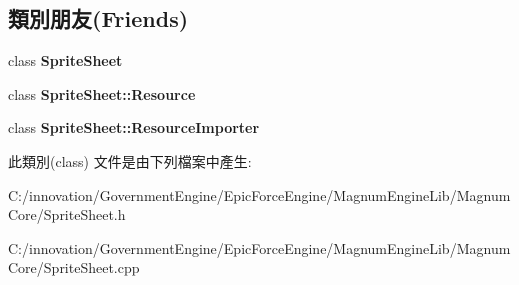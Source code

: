 \subsection*{類別朋友(Friends)}
\begin{DoxyCompactItemize}
\item 
class {\bfseries Sprite\+Sheet}\hypertarget{class_i_dream_sky_1_1_sprite_sheet_1_1_sequence_ab43118917ba092ba6289c7ee4cd3e5fd}{}\label{class_i_dream_sky_1_1_sprite_sheet_1_1_sequence_ab43118917ba092ba6289c7ee4cd3e5fd}

\item 
class {\bfseries Sprite\+Sheet\+::\+Resource}\hypertarget{class_i_dream_sky_1_1_sprite_sheet_1_1_sequence_a8727041c910f9527ea7b20dfac74f485}{}\label{class_i_dream_sky_1_1_sprite_sheet_1_1_sequence_a8727041c910f9527ea7b20dfac74f485}

\item 
class {\bfseries Sprite\+Sheet\+::\+Resource\+Importer}\hypertarget{class_i_dream_sky_1_1_sprite_sheet_1_1_sequence_a3c6baee866d2819736b4c0a94c9e507c}{}\label{class_i_dream_sky_1_1_sprite_sheet_1_1_sequence_a3c6baee866d2819736b4c0a94c9e507c}

\end{DoxyCompactItemize}


此類別(class) 文件是由下列檔案中產生\+:\begin{DoxyCompactItemize}
\item 
C\+:/innovation/\+Government\+Engine/\+Epic\+Force\+Engine/\+Magnum\+Engine\+Lib/\+Magnum\+Core/Sprite\+Sheet.\+h\item 
C\+:/innovation/\+Government\+Engine/\+Epic\+Force\+Engine/\+Magnum\+Engine\+Lib/\+Magnum\+Core/Sprite\+Sheet.\+cpp\end{DoxyCompactItemize}
